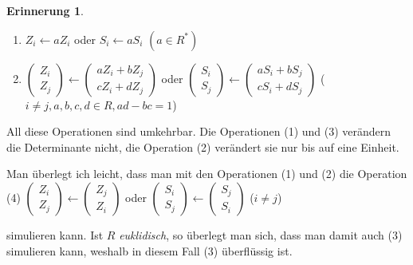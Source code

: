 \documentclass[
twoside=semi,
fontsize=12,
DIV=12, 
cleardoublepage=current,
leqno,
headings=optiontoheadandtoc, 
toc=idx
]{scrbook}
\newcommand{\Z}{\mathbb{Z}}
\theoremstyle{definition}
\newtheorem{erinnerung}[definition]{Erinnerung}
\begin{document}
\begin{erinnerung}
\begin{enumerate}[(1)]
				\item $Z_i \gets aZ_i$ oder $S_i \gets aS_i$ \hfill $(a \in R^*)$
				
				\item $\begin{pmatrix}
					Z_i\\Z_j
				\end{pmatrix}\gets \begin{pmatrix}
				aZ_i + bZ_j\\cZ_i + dZ_j
			\end{pmatrix}$ oder 
			$\begin{pmatrix}
				S_i\\S_j
			\end{pmatrix}\gets \begin{pmatrix}
				aS_i + bS_j\\cS_i + dS_j
			\end{pmatrix}$ \hfill ($i\neq j, a, b, c, d \in R, ad -bc = 1$)
			\end{enumerate}
		All diese Operationen sind umkehrbar. Die Operationen (1) und (3) ver\"andern die Determinante nicht, die Operation (2) ver\"andert sie nur bis auf eine Einheit. 
		
		Man \"uberlegt ich leicht, dass man mit den Operationen (1) und (2) die Operation (4)\newline
		$\begin{pmatrix}
			Z_i\\Z_j
		\end{pmatrix}\gets \begin{pmatrix}
			Z_j\\Z_i
		\end{pmatrix}$ oder $\begin{pmatrix}
			S_i\\S_j
		\end{pmatrix}\gets \begin{pmatrix}
		S_j\\S_i
	\end{pmatrix}$ \hfill ($i\neq j$)\newline

	simulieren kann. Ist $R$ \emph{euklidisch}, so \"uberlegt man sich, dass man damit auch (3) simulieren kann, weshalb in diesem Fall (3) \"uberfl\"ussig ist.
	

\end{erinnerung}
\end{document}
